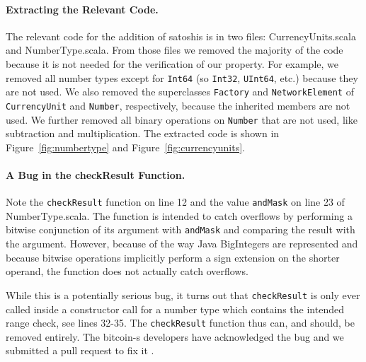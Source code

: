 \documentclass[hyphens, a4paper,USenglish,cleveref, autoref, thm-restate]{oasics-v2019}
\begin{document}
\paragraph{Extracting the Relevant Code.} The relevant code for the
addition of satoshis is in two files: CurrencyUnits.scala and
NumberType.scala. From those files we removed the majority of the code
because it is not needed for the verification of our property. For
example, we removed all number types except for \texttt{Int64} (so
\texttt{Int32}, \texttt{UInt64}, etc.) because they are not used. We
also removed the superclasses \texttt{Factory} and
\texttt{NetworkElement} of \texttt{CurrencyUnit} and \texttt{Number},
respectively, because the inherited members are not used. We further
removed all binary operations on \texttt{Number} that are not used,
like subtraction and multiplication. The extracted code is shown in
Figure~\ref{fig:numbertype} and Figure~\ref{fig:currencyunits}.

\paragraph{A Bug in the checkResult Function.} Note the
\texttt{checkResult} function on line 12 and the value
\texttt{andMask} on line 23 of NumberType.scala. The function is
intended to catch overflows by performing a bitwise conjunction of its
argument with \texttt{andMask} and comparing the result with the
argument. However, because of the way Java BigIntegers are represented
\cite{wikipedia:twocomp} and because bitwise operations implicitly
perform a sign extension \cite{java:bigint} on the shorter operand,
the function does not actually catch overflows.

While this is a potentially serious bug, it turns out that
\texttt{checkResult} is only ever called inside a constructor call for
a number type which contains the intended range check, see lines
32-35. The \texttt{checkResult} function thus can, and should, be
removed entirely. The bitcoin-s developers have acknowledged the bug
and we submitted a pull request to fix it \cite{BitcoinS:pull565}.

\end{document}
